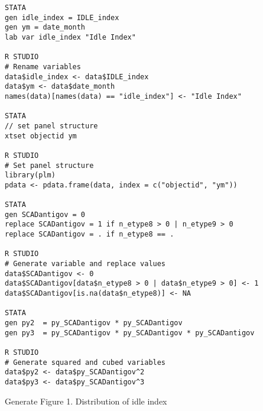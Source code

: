 \documentclass[12pt,letterpaper]{article}
\begin{document}
\begin{lstlisting}
STATA	
gen idle_index = IDLE_index
gen ym = date_month
lab var idle_index "Idle Index"

R STUDIO
# Rename variables
data$idle_index <- data$IDLE_index
data$ym <- data$date_month
names(data)[names(data) == "idle_index"] <- "Idle Index"

STATA
// set panel structure
xtset objectid ym

R STUDIO
# Set panel structure
library(plm)
pdata <- pdata.frame(data, index = c("objectid", "ym"))

STATA
gen SCADantigov = 0
replace SCADantigov = 1 if n_etype8 > 0 | n_etype9 > 0 
replace SCADantigov = . if n_etype8 == .

R STUDIO
# Generate variable and replace values
data$SCADantigov <- 0
data$SCADantigov[data$n_etype8 > 0 | data$n_etype9 > 0] <- 1
data$SCADantigov[is.na(data$n_etype8)] <- NA

STATA
gen py2  = py_SCADantigov * py_SCADantigov
gen py3  = py_SCADantigov * py_SCADantigov * py_SCADantigov

R STUDIO
# Generate squared and cubed variables
data$py2 <- data$py_SCADantigov^2
data$py3 <- data$py_SCADantigov^3

\end{lstlisting}

Generate Figure 1. Distribution of idle index
\end{document}
